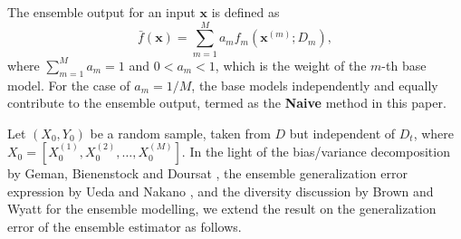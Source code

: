 \documentclass{article}
\begin{document}
The ensemble output for an input $\bm{x}$ is defined as 
\begin{equation}
\label{Eq10_Ensemble_Output}
\bar{f}(\bm{x}) = \sum_{m=1}^{M}a_{m}f_m(\bm{x}^{(m)}; D_m),
\end{equation}
where $\sum_{m=1}^M a_m=1$ and $ 0<a_m<1 $, which is the weight of the $m$-th base model.
For the case of $a_m = 1/M$, the base models independently and equally contribute to the ensemble output, termed as the \textbf{Naive} method in this paper.

Let $(X_0, Y_0)$ be a random sample, taken from $D$ but independent of $D_t$, where $X_0 = [X_0^{(1)}, X_0^{(2)}, \dots, X_0^{(M)}]$.
In the light of the bias/variance decomposition by Geman, Bienenstock and Doursat \cite{geman1992neural}, the ensemble generalization error expression by Ueda and Nakano \cite{ueda1996generalization}, and the diversity discussion by Brown and Wyatt \cite{brown2005managing} for the ensemble modelling,
we extend the result on the generalization error of the ensemble estimator as follows.
\end{document}
